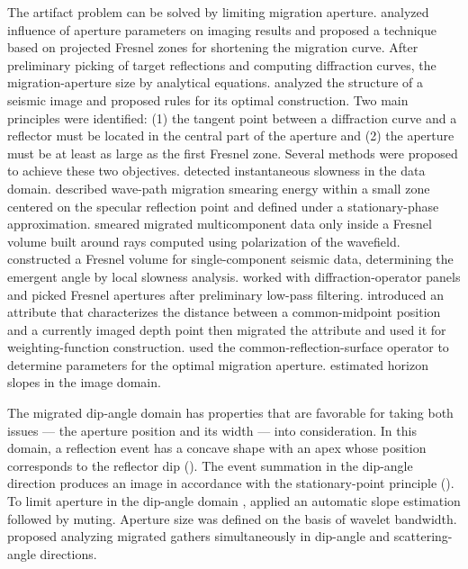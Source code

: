 The artifact problem can be solved by limiting migration aperture. \citet[]{schleicher97} analyzed 
influence of aperture parameters on imaging results and proposed a technique based on projected Fresnel zones 
for shortening the migration curve. After preliminary picking of target 
reflections and computing diffraction curves,  the migration-aperture size by
analytical equations. \citet[]{sun98} analyzed the structure of a seismic image and proposed rules for its 
optimal construction. Two main principles were identified: (1) the tangent point between a diffraction curve and
a reflector must be located in the central part of the aperture and (2) the aperture must be at least as large as the first
Fresnel zone. Several methods were proposed to achieve these two objectives. \citet[]{tillmanns99} detected
instantaneous slowness in the data domain. \citet[]{sun01} described wave-path migration smearing energy 
within a small zone centered on the specular reflection point and defined under a stationary-phase
approximation. \citet[]{luth05} smeared migrated multicomponent data only inside a Fresnel volume built
around rays computed using polarization of the wavefield. \citet[]{buske09} constructed a Fresnel volume for
single-component seismic data, determining the emergent angle by local slowness analysis.
\citet[]{tabti04} worked with diffraction-operator panels and picked Fresnel apertures 
after preliminary low-pass filtering. \citet[]{kabbej07} introduced an attribute that characterizes the distance 
between a common-midpoint position and a currently imaged depth point then migrated the attribute and used it for
weighting-function construction. \citet[]{spinner07} used the common-reflection-surface operator to determine
parameters for the optimal migration aperture. \citet[]{alerini09} estimated horizon slopes in the image domain.

The migrated dip-angle domain has properties that are favorable for taking both issues --- the aperture 
position and its width --- into consideration. In this domain, a reflection event has a concave shape with
an apex whose position corresponds to the reflector dip (\citealp[]{audebert02,landa08,klokov12}). 
The event summation in the dip-angle direction produces an image in accordance with the stationary-point
principle (\citealp[]{bleistein01}). To limit aperture in the dip-angle domain , 
\citet[]{bienati09} applied an automatic slope estimation followed by muting. Aperture size was defined on the basis of wavelet bandwidth.
\citet[]{dafni12} proposed analyzing migrated gathers simultaneously in dip-angle and scattering-angle directions.

